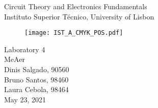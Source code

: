
\thispagestyle {empty}






\begin{center}


\vspace{1.0cm}

\vspace{1cm}
{\FontLb Circuit Theory and Electronics Fundamentals} \\ %
\vspace{1cm}
{\FontSn Instituto Superior Técnico, University of Lisbon} \\ %
\vspace{1cm}

\begin{figure}[h] \centering
\texttt{[image: IST\_A\_CMYK\_POS.pdf]} 
\end{figure}

{\FontSn Laboratory 4} \\
\vspace{1cm}
{\FontSn MeAer} \\
\vspace{1cm}
{\FontSn Dinis Salgado, 90560} \\
\vspace{0.5cm}
{\FontSn Bruno Santos, 98460} \\
\vspace{0.5cm}
{\FontSn Laura Cebola, 98464} \\
\vspace{1cm}
{\FontSn May 23, 2021} \\ %
\vspace{1cm}
%
\end{center}
